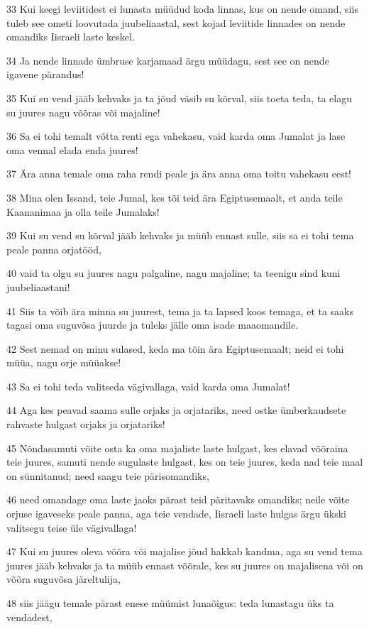 \par 33 Kui keegi leviitidest ei lunasta müüdud koda linnas, kus on nende omand, siis tuleb see ometi loovutada juubeliaastal, sest kojad leviitide linnades on nende omandiks Iisraeli laste keskel.
\par 34 Ja nende linnade ümbruse karjamaad ärgu müüdagu, sest see on nende igavene pärandus!
\par 35 Kui su vend jääb kehvaks ja ta jõud väsib su kõrval, siis toeta teda, ta elagu su juures nagu võõras või majaline!
\par 36 Sa ei tohi temalt võtta renti ega vahekasu, vaid karda oma Jumalat ja lase oma vennal elada enda juures!
\par 37 Ära anna temale oma raha rendi peale ja ära anna oma toitu vahekasu eest!
\par 38 Mina olen Issand, teie Jumal, kes tõi teid ära Egiptusemaalt, et anda teile Kaananimaa ja olla teile Jumalaks!
\par 39 Kui su vend su kõrval jääb kehvaks ja müüb ennast sulle, siis sa ei tohi tema peale panna orjatööd,
\par 40 vaid ta olgu su juures nagu palgaline, nagu majaline; ta teenigu sind kuni juubeliaastani!
\par 41 Siis ta võib ära minna su juurest, tema ja ta lapsed koos temaga, et ta saaks tagasi oma suguvõsa juurde ja tuleks jälle oma isade maaomandile.
\par 42 Sest nemad on minu sulased, keda ma tõin ära Egiptusemaalt; neid ei tohi müüa, nagu orje müüakse!
\par 43 Sa ei tohi teda valitseda vägivallaga, vaid karda oma Jumalat!
\par 44 Aga kes peavad saama sulle orjaks ja orjatariks, need ostke ümberkaudsete rahvaste hulgast orjaks ja orjatariks!
\par 45 Nõndasamuti võite osta ka oma majaliste laste hulgast, kes elavad võõraina teie juures, samuti nende sugulaste hulgast, kes on teie juures, keda nad teie maal on sünnitanud; need saagu teie pärisomandiks,
\par 46 need omandage oma laste jaoks pärast teid päritavaks omandiks; neile võite orjuse igaveseks peale panna, aga teie vendade, Iisraeli laste hulgas ärgu ükski valitsegu teise üle vägivallaga!
\par 47 Kui su juures oleva võõra või majalise jõud hakkab kandma, aga su vend tema juures jääb kehvaks ja ta müüb ennast võõrale, kes su juures on majalisena või on võõra suguvõsa järeltulija,
\par 48 siis jäägu temale pärast enese müümist lunaõigus: teda lunastagu üks ta vendadest,
